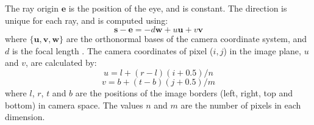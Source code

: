 \documentclass[journal]{IEEEtran}
\begin{document}
The ray origin $\mathbf{e}$ is the position of the eye, and is constant. The direction is unique for each ray, and is computed using:
\begin{equation}
  \mathbf{s} - \mathbf{e} = -d \mathbf{w} + u \mathbf{u} + v \mathbf{v}
  \label{eq:raydirection}
\end{equation}
where $\{\mathbf{u},\mathbf{v},\mathbf{w}\}$ are the orthonormal bases of the camera coordinate system, and $d$ is the focal length \cite{Shirley:2009}. The camera coordinates of pixel ($i,j$) in the image plane, $u$ and $v$, are calculated by:
\[ u = l + (r-l)(i+0.5)/n \]
\[ v = b + (t-b)(j+0.5)/m \]
where $l$, $r$, $t$ and $b$ are the positions of the image borders (left, right, top and bottom) in camera space. The values $n$ and $m$ are the number of pixels in each dimension.
\end{document}
